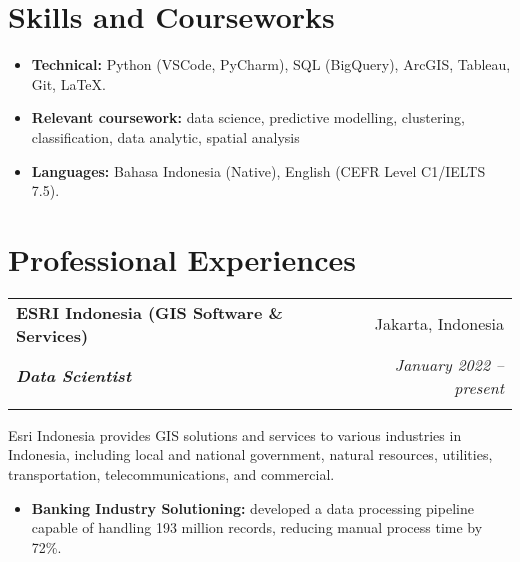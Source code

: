 \documentclass[a4paper, 11pt]{article}
\makeatletter
\newcommand{\resumeItem}[2]{
    \item\small{
        \textbf{#1}{#2 \vspace{-2pt}}
    }
}
\newcommand{\resumeSubheading}[4]{
    \vspace{-1pt}
    \begin{tabular*}{0.97\textwidth}{l@{\extracolsep{\fill}}r}
        \color{lightblue}\textbf{#1} & #2 \\
        \textbf{\textit{\small#3}} & \textit{\small #4} \\
        \textnormal{}\vspace{-5pt}
    \end{tabular*}\vspace{-5pt}
}
\newcommand{\resumeSubHeadingListStart}{\begin{itemize}[leftmargin=*]}
\newcommand{\resumeItemListStart}{\begin{itemize}[leftmargin=*]\setlength\itemsep{0em}\vspace{-1pt}}
\newcommand{\resumeItemListEnd}{\end{itemize}\vspace{-5pt}}
\makeatother
\begin{document}
    
    \vspace{20pt}
    \section{Skills and Courseworks}
    \resumeItemListStart
    \resumeItem{Technical:}{
        Python (VSCode, PyCharm), 
        SQL (BigQuery), 
        ArcGIS, 
        Tableau, 
        Git, 
        \LaTeX.
    }
    \resumeItem{Relevant coursework:}{
        data science, 
        predictive modelling, 
        clustering, 
        classification, 
        data analytic, 
        spatial analysis
    } 
    \resumeItem{Languages:}{
        Bahasa Indonesia (Native), 
        English (CEFR Level C1/IELTS 7.5).
    }
    \resumeItemListEnd
    
    \vspace{-5pt}
    \section{Professional Experiences}

    \resumeSubheading
    {ESRI Indonesia (GIS Software \& Services)}{Jakarta, Indonesia}
    {Data Scientist}{January 2022 – present}
    {Esri Indonesia provides GIS solutions and services to various industries in Indonesia, 
    including local and national government, natural resources, utilities, transportation, telecommunications, and commercial.}
    \vspace{-5pt}
    \resumeItemListStart
    \resumeItem{Banking Industry Solutioning:}{ developed a data processing pipeline capable of handling 193 million records, reducing manual process time by 72\%.}
    \resumeItemListEnd
    
\end{document}
